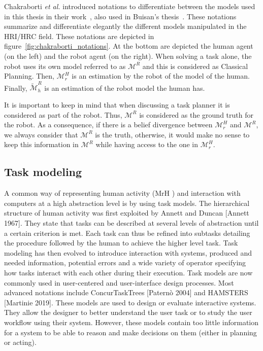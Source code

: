 Chakraborti \textit{et al.} introduced notations to differentiate between the models used in this thesis in their work~\cite{ChakrabortiBTZS15}, also used in Buisan's thesis~\cite{thesisBuisan21}. These notations summarize and differentiate elegantly the different models manipulated in the HRI/HRC field. These notations are depicted in figure~\ref{fig:chakraborti_notations}. At the bottom are depicted the human agent (on the left) and the robot agent (on the right). When solving a task alone, the robot uses its own model referred to as $\mathcal{M}^R$ and this is considered as Classical Planning. 
Then, $\mathcal{M}^H_r$ is an estimation by the robot of the model of the human. Finally, $\tilde{\mathcal{M}}^R_h$ is an estimation of the robot model the human has. 

It is important to keep in mind that when discussing a task planner it is considered as part of the robot. Thus, $\mathcal{M}^R$ is considered as the ground truth for the robot. As a consequence, if there is a belief divergence between $\mathcal{M}^H_r$ and $\mathcal{M}^R$, we always consider that $\mathcal{M}^R$ is the truth, otherwise, it would make no sense to keep this information in $\mathcal{M}^R$ while having access to the one in $\mathcal{M}^H_r$.

\subsection{Task modeling}

A common way of representing human activity (MrH ) and interaction with computers at a high abstraction level is by using task models. The hierarchical structure of human activity was first exploited by Annett and Duncan [Annett 1967]. They state that tasks can be described at several levels of abstraction until a certain criterion is met. Each task can thus be refined into subtasks detailing the procedure followed by the human to achieve the higher level task. Task modeling has then evolved to introduce interaction with systems, produced and needed information, potential errors and a wide variety of operator specifying how tasks interact with each other during their execution. Task models are now commonly used in user-centered and user-interface design processes. Most advanced notations include ConcurTaskTrees [Paternò 2004] and HAMSTERS [Martinie 2019]. These models are used to design or evaluate interactive systems. They allow the designer to better understand the user task or to study the user workflow using their system. However, these models contain too little information for a system to be able to reason and make decisions on them (either in planning or acting).


